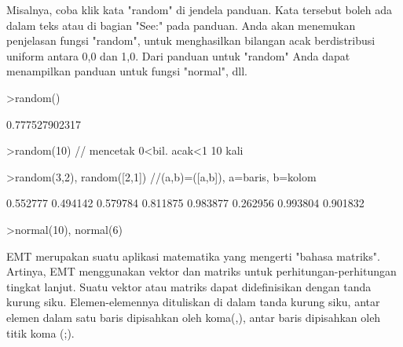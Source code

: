 \documentclass[a4paper,10pt]{article}
\begin{document}
\begin{eulernotebook}
\begin{eulercomment}
Misalnya, coba klik kata "random" di jendela panduan. Kata tersebut
boleh ada dalam teks atau di bagian "See:" pada panduan. Anda akan
menemukan penjelasan fungsi "random", untuk menghasilkan bilangan acak
berdistribusi uniform antara 0,0 dan 1,0. Dari panduan untuk "random"
Anda dapat menampilkan panduan untuk fungsi "normal", dll.
\end{eulercomment}
\begin{eulerprompt}
>random()
\end{eulerprompt}
\begin{euleroutput}
  0.777527902317
\end{euleroutput}
\begin{eulerprompt}
>random(10) // mencetak 0<bil. acak<1 10 kali
\end{eulerprompt}
\begin{euleroutput}
  [0.237424,  0.978964,  0.0367821,  0.191109,  0.642479,  0.233536,
  0.0910807,  0.899334,  0.983636,  0.21102]
\end{euleroutput}
\begin{eulerprompt}
>random(3,2), random([2,1]) //(a,b)=([a,b]), a=baris, b=kolom
\end{eulerprompt}
\begin{euleroutput}
       0.552777      0.494142 
       0.579784      0.811875 
       0.983877      0.262956 
       0.993804 
       0.901832 
\end{euleroutput}
\begin{eulerprompt}
>normal(10), normal(6)
\end{eulerprompt}
\begin{euleroutput}
  [-1.29602,  0.679832,  -0.640637,  -0.456261,  -0.743291,  1.16909,
  -2.07702,  1.35647,  0.239489,  -0.471085]
  [-1.35778,  -1.10799,  -1.6828,  -1.89383,  -0.210226,  -1.07112]
\end{euleroutput}
\begin{eulercomment}
EMT merupakan suatu aplikasi matematika yang mengerti "bahasa
matriks". Artinya, EMT menggunakan vektor dan matriks untuk
perhitungan-perhitungan tingkat lanjut. Suatu vektor atau matriks
dapat didefinisikan dengan tanda kurung siku. Elemen-elemennya
dituliskan di dalam tanda kurung siku, antar elemen dalam satu baris
dipisahkan oleh koma(,), antar baris dipisahkan oleh titik koma (;).


\end{eulercomment}
\end{eulernotebook}
\end{document}
